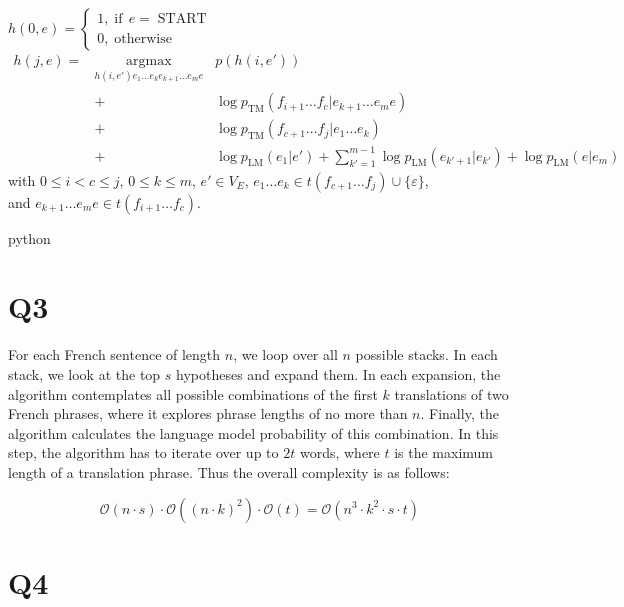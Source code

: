 \documentclass[11pt]{article}
\newcommand{\nocomma}{}
\newcommand{\noplus}{}
\newcommand{\tmop}[1]{\ensuremath{\operatorname{#1}}}
\newcommand{\upl}{+}
\begin{document}
$h (0 \nocomma, e) = \left\{ \begin{array}{l}
1 \nocomma, \tmop{if} \, e = \tmop{START}\\
0 \nocomma, \tmop{otherwise}
\end{array} \right.$
\begin{eqnarray}
h (j, e) = & \underset{h (i, e') e_1 \ldots e_k e_{k + 1} \ldots e_m
	e}{\tmop{argmax}}_{} & p (h (i, e')) \nonumber\\
& + & \log p_{\tmop{TM}} (f_{i + 1} \ldots f_c |e_{k + 1} \ldots e_m e)
\nonumber\\
& \noplus + & \log p_{\tmop{TM}} (f_{c + 1} \ldots f_j |e_1 \ldots e_k)
\nonumber\\
& \upl & \log p_{\tmop{LM}} (e_1 |e') + \sum_{k' = 1}^{m - 1} \log
p_{\tmop{LM}} (e_{k' + 1} |e_{k'}) + \log p_{\tmop{LM}} (e|e_m) \nonumber
\end{eqnarray}
with $0 \leq i < c \leq j$, $0 \leq k \leq m$, $e' \in V_E$, $e_1 \ldots e_k
\in t (f_{c + 1} \ldots f_j) \cup \{ \varepsilon \}$,\\
and $e_{k + 1} \ldots e_m e \in t (f_{i + 1} \ldots f_c)$.

python

\section*{Q3}
For each French sentence of length $n$, we loop over all $n$ possible
stacks. In each stack, we look at the top $s$ hypotheses and expand them.
In each expansion, the algorithm contemplates all possible combinations of
the first $k$ translations of two French phrases, where it explores phrase
lengths of no more than $n$. Finally, the algorithm calculates the language
model probability of this combination. In this step, the algorithm has to
iterate over up to $2 t$ words, where $t$ is the maximum length of a
translation phrase. Thus the overall complexity is as follows:

\[
\mathcal{O}(n \cdot s) \cdot \mathcal{O}({(n \cdot k)}^2)
\cdot \mathcal{O}(t)
= \mathcal{O}(n^3 \cdot k^2 \cdot s \cdot t)
\]

\section*{Q4}
\end{document}
